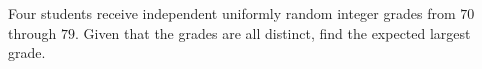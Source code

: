 Four students receive independent uniformly random integer grades from $70$ through $79$. Given that the grades are all distinct, find the expected largest grade.
